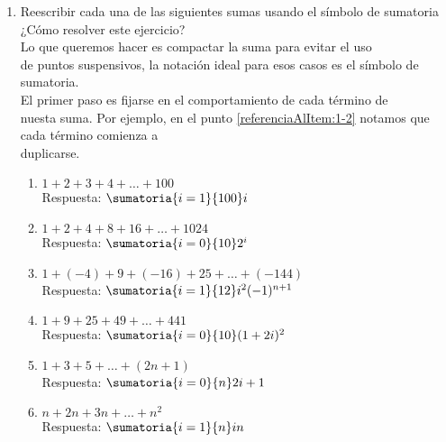 \ejercicio
\begin{enumerate}[label=\roman*)]
    \item Reescribir cada una de las siguientes sumas usando el símbolo de sumatoria\\ 
    
    ¿Cómo resolver este ejercicio?\\
    Lo que queremos hacer es compactar la suma para evitar el uso\\
    de puntos suspensivos, la notación ideal para esos casos es el símbolo de sumatoria.\\
    El primer paso es fijarse en el comportamiento de cada término de\\
    nuesta suma. Por ejemplo, en el punto \ref{referenciaAlItem:1-2} notamos que cada término comienza a\\
    duplicarse.


    \begin{enumerate}[label=\alph*)] 
        \item  $1 + 2 + 3 + 4 + \dots + 100$\\
        Respuesta: $ \sumatoria{i=1}{100}i $\\

        \item\label{referenciaAlItem:1-2}  $1 + 2 + 4 + 8 + 16 + \dots + 1024$\\
        Respuesta: $ \sumatoria{i=0}{10}2^i $\\

      \item  $1 + (-4) + 9 + (-16) + 25 + \dots + (-144)$\\
        Respuesta: $ \sumatoria{i=1}{12}i^2(-1)^{n+1} $\\

        \item $1 + 9 + 25 + 49 + \dots + 441$\\

        Respuesta: $ \sumatoria{i=0}{10}(1+2i)^2 $\\

        \item $1 + 3 + 5 + \dots + (2n + 1)$\\
        Respuesta: $ \sumatoria{i=0}{n} 2i+1 $\\

        \item $n + 2n + 3n + \dots + n^2$\\
        Respuesta: $ \sumatoria{i=1}{n} in $\\
    \end{enumerate}
\end{enumerate}

